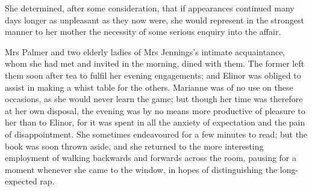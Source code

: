 She determined, after some consideration, that if appearances continued many days longer as unpleasant as they now were, she would represent in the strongest manner to her mother the necessity of some serious enquiry into the affair.

Mrs Palmer and two elderly ladies of Mrs Jennings’s intimate acquaintance, whom she had met and invited in the morning, dined with them. The former left them soon after tea to fulfil her evening engagements; and Elinor was obliged to assist in making a whist table for the others. Marianne was of no use on these occasions, as she would never learn the game; but though her time was therefore at her own disposal, the evening was by no means more productive of pleasure to her than to Elinor, for it was spent in all the anxiety of expectation and the pain of disappointment. She sometimes endeavoured for a few minutes to read; but the book was soon thrown aside, and she returned to the more interesting employment of walking backwards and forwards across the room, pausing for a moment whenever she came to the window, in hopes of distinguishing the long-expected rap.